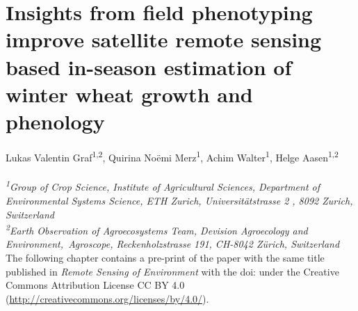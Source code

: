 \chapter{Insights from field phenotyping improve satellite remote sensing based in-season estimation of winter wheat growth and phenology}
\label{chap:eodal}
\graphicspath{{./05-Insights/img}}

Lukas Valentin Graf\textsuperscript{1,2}, Quirina Noëmi Merz\textsuperscript{1}, Achim Walter\textsuperscript{1}, Helge Aasen\textsuperscript{1,2}
\\
\normalsize
\vspace{2pt}
\\
\textit{\textsuperscript{1}Group of Crop Science, Institute of Agricultural Sciences, Department of Environmental Systems Science, ETH Zurich, Universitätstrasse 2 , 8092 Zurich, Switzerland
\\
\textsuperscript{2}Earth Observation of Agroecosystems Team, Devision Agroecology and Environment,\ Agroscope, Reckenholzstrasse 191, CH-8042 Zürich, Switzerland
\vspace{2cm}}
\\

The following chapter contains a pre-print of the paper with the same title published in \textsl{Remote Sensing of Environment} with the doi:  under the Creative Commons Attribution License CC BY 4.0 (\url{http://creativecommons.org/licenses/by/4.0/}).


